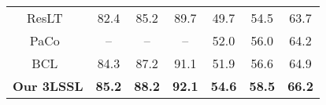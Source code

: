 \documentclass[10pt,journal,compsoc]{IEEEtran}
\begin{document}
\begin{table*}[t]
\begin{tabular}{c|ccc|ccc}
ResLT~\cite{ResLTPAMI}                     & 82.4           & 85.2           & 89.7          & 49.7           & 54.5           & 63.7           \\
PaCo~\cite{Cui_2021_ICCV}                  & --             & --             & --            & 52.0           & 56.0           & 64.2           \\
BCL~\cite{BCLcvpr22}                       & 84.3           & 87.2           & 91.1          & 51.9           & 56.6           & 64.9           \\
\hline
\textbf{Our 3LSSL}                         & \textbf{85.2}  & \textbf{88.2}  & \textbf{92.1} & \textbf{54.6}  & \textbf{58.5}  & \textbf{66.2} \\
\bottomrule           
\end{tabular}
\label{table:resultsCIFARLT}
\end{table*}
\end{document}
